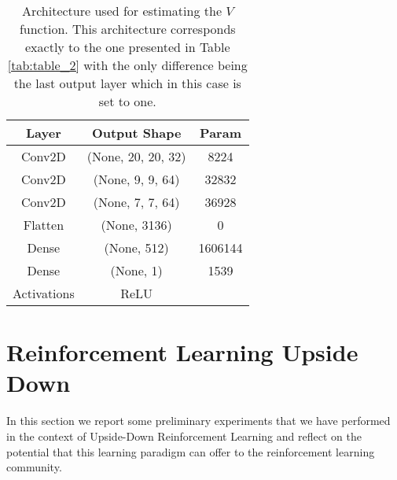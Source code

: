 \begin{table}[ht!]
\centering
\caption{Architecture used for estimating the $V$ function. This architecture corresponds exactly to the one presented in Table \ref{tab:table_2} with the only difference being the last output layer which in this case is set to one.}
\begin{tabular}{c | c | c | }
Layer & Output Shape & Param \\
\hline \hline 
Conv2D & (None, 20, 20, 32) & 8224 \\     
Conv2D & (None, 9, 9, 64) & 32832 \\ 
Conv2D & (None, 7, 7, 64)  & 36928 \\ 
Flatten & (None, 3136) & 0 \\
Dense & (None, 512) & 1606144 \\
Dense & (None, 1) & 1539 \\
Activations & ReLU & \\

\end{tabular}
\label{tab:table_3}
\end{table}





\section{Reinforcement Learning Upside Down}
In this section we report some preliminary experiments that we have performed in the context of Upside-Down Reinforcement Learning and reflect on the potential that this learning paradigm can offer to the reinforcement learning community. 

